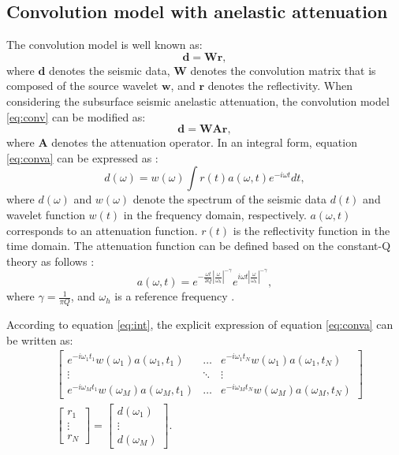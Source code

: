 \subsection{Convolution model with anelastic attenuation}
The convolution model is well known as:
\begin{equation}
\label{eq:conv}
\mathbf{d} = \mathbf{Wr},
\end{equation}
where $\mathbf{d}$ denotes the seismic data, $\mathbf{W}$ denotes the convolution matrix that is composed of the source wavelet $\mathbf{w}$, and $\mathbf{r}$ denotes the reflectivity. When considering the subsurface seismic anelastic attenuation, the convolution model \ref{eq:conv} can be modified as:
\begin{equation}
\label{eq:conva}
\mathbf{d} = \mathbf{WAr},
\end{equation}
where $\mathbf{A}$ denotes the attenuation operator. In an integral form, equation \ref{eq:conva} can be expressed as \cite[]{margrave2011gabor,yufeng2018l12}:
\begin{equation}
\label{eq:int}
d(\omega) = w(\omega) \int r(t)a(\omega,t)e^{-i\omega t}dt,
\end{equation}
where $d(\omega)$ and $w(\omega)$ denote the spectrum of the seismic data $d(t)$ and wavelet function $w(t)$ in the frequency domain, respectively. $a(\omega,t)$ corresponds to an attenuation function. $r(t)$ is the reflectivity function in the time domain. The attenuation function can be defined based on the constant-Q theory as follows \cite[]{zhu2014q,yufeng2018l12}:
\begin{equation}
\label{eq:af}
a(\omega, t) = e^{-\frac{\omega t}{2Q}\left | \frac{\omega}{\omega_h} \right |^{-\gamma}}e^{i \omega t \left | \frac{\omega}{\omega_h} \right |^{-\gamma}},
\end{equation}
where $\gamma=\frac{1}{\pi Q}$, and $\omega_h$ is a reference frequency . 

According to equation \ref{eq:int}, the explicit expression of equation \ref{eq:conva} can be written as:
\begin{equation}
\label{eq:exp}
\begin{split}
&\left[ \begin{array}{ccc}
e^{-i \omega_1 t_1}w(\omega_1)a(\omega_1, t_1) & \ldots & e^{-i \omega_1 t_N}w(\omega_1)a(\omega_1, t_N) \\
\vdots & \ddots & \vdots \\
e^{-i \omega_M t_1}w(\omega_M)a(\omega_M, t_1) & \ldots & e^{-i \omega_M t_N}w(\omega_M)a(\omega_M, t_N)
\end{array} \right] \\
&\left[\begin{array}{c} r_1 \\ \vdots \\ r_N \end{array} \right] = \left[\begin{array}{c} d(\omega_1) \\ \vdots \\ d(\omega_M) \end{array} \right] .
\end{split}
\end{equation}

